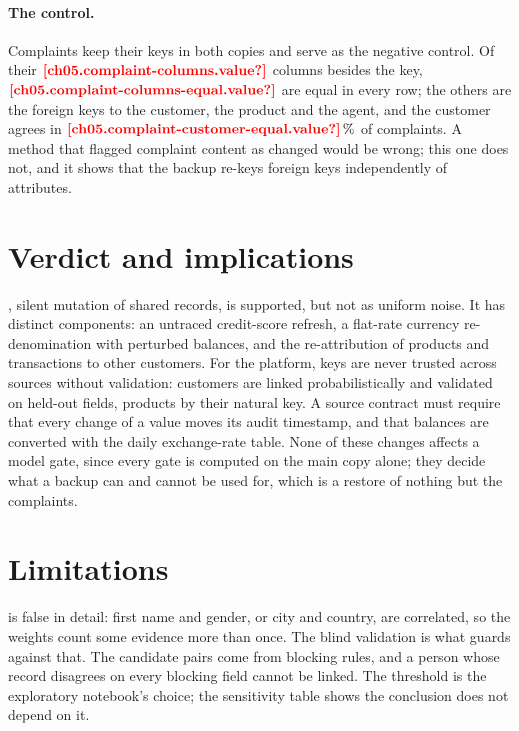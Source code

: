 \paragraph{The control.} Complaints keep their keys in both copies and serve as the negative control. Of their
$\est{ch05.complaint-columns}{value}$ columns besides the key, $\est{ch05.complaint-columns-equal}{value}$ are equal in
every row; the others are the foreign keys to the customer, the product and the agent, and the customer agrees in
$\est{ch05.complaint-customer-equal}{value}\,\%$ of complaints. A method that flagged complaint content as changed would be
wrong; this one does not, and it shows that the backup re-keys foreign keys independently of attributes.

\section{Verdict and implications}\label{sec:rl-verdict}

, silent mutation of shared records, is supported, but not as uniform noise. It has distinct components: an
untraced credit-score refresh, a flat-rate currency re-denomination with perturbed balances, and the re-attribution of
products and transactions to other customers. For the platform, keys are never trusted across sources without
validation: customers are linked probabilistically and validated on held-out fields, products by their natural key.
A source contract must require that every change of a value moves its audit timestamp, and that balances are
converted with the daily exchange-rate table. None of these changes affects a model gate, since every gate is computed
on the main copy alone; they decide what a backup can and cannot be used for, which is a restore of nothing but the
complaints.

\section{Limitations}\label{sec:rl-limits}

 is false in detail: first name and gender, or city and country, are correlated, so the weights count
some evidence more than once. The blind validation is what guards against that. The candidate pairs come from blocking rules,
and a person whose record disagrees on every blocking field cannot be linked. The threshold is the exploratory
notebook's choice; the sensitivity table shows the conclusion does not depend on it.
